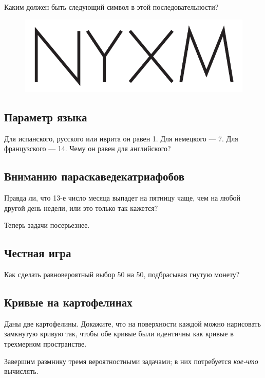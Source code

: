 Каким должен быть следующий символ в этой последовательности?

\begin{figure}[h!]
\centering
\includegraphics[scale=0.5]{pics/ZYXW}
\end{figure}

\subsection*{Параметр языка}

Для испанского, русского или иврита он равен 1.
Для немецкого --- 7.
Для французского --- 14.
Чему он равен для английского?

\subsection*{Вниманию параскаведекатриафобов}

Правда ли, что 13-е число месяца выпадет на пятницу чаще,
чем на любой другой день недели,
или это только так кажется?

\medskip

Теперь задачи посерьезнее.

\subsection*{Честная игра}

Как сделать равновероятный выбор 50 на 50, подбрасывая гнутую монету?

\subsection*{Кривые на картофелинах}

Даны две картофелины.
Докажите, что на поверхности каждой можно нарисовать замкнутую кривую так, чтобы обе кривые были идентичны как кривые в трехмерном пространстве.

\medskip

Завершим размнику тремя вероятностными задачами; в них потребуется \emph{кое-что} вычислять.

